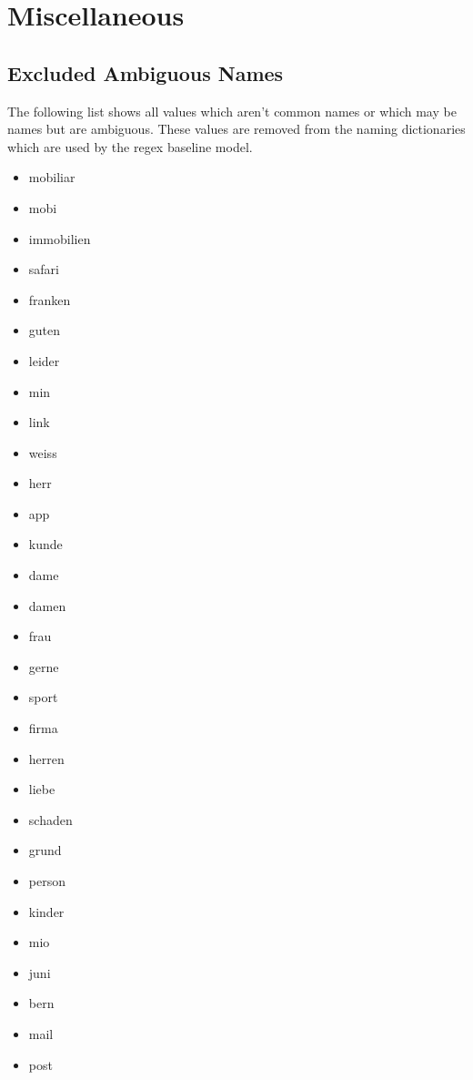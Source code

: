 \section{Miscellaneous}

\subsection{Excluded Ambiguous Names}
\label{lst:excluded-names}

The following list shows all values which aren't common names or which may be names but are ambiguous. These values are removed from the naming dictionaries which are used by the regex baseline model.

\begin{multicols}{4}
    \begin{itemize}
        \item mobiliar
        \item mobi
        \item immobilien
        \item safari
        \item franken
        \item guten
        \item leider
        \item min
        \item link
        \item weiss
        \item herr
        \item app
        \item kunde
        \item dame
        \item damen
        \item frau
        \item gerne
        \item sport
        \item firma
        \item herren
        \item liebe
        \item schaden
        \item grund
        \item person
        \item kinder
        \item mio
        \item juni
        \item bern
        \item mail
        \item post

\end{itemize}
\end{multicols}
